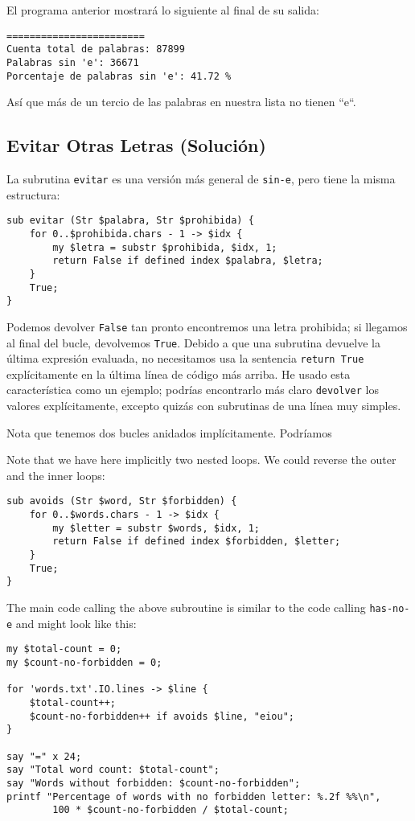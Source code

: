 El programa anterior mostrará lo siguiente al final de 
su salida:

\begin{verbatim}
========================
Cuenta total de palabras: 87899
Palabras sin 'e': 36671
Porcentaje de palabras sin 'e': 41.72 %
\end{verbatim}

Así que más de un tercio de las palabras en nuestra lista no
tienen ``e``.

\subsection{Evitar Otras Letras (Solución)}

La subrutina {\tt evitar} es una versión más general de 
\verb|sin-e|, pero tiene la misma estructura:

\begin{verbatim}
sub evitar (Str $palabra, Str $prohibida) {
    for 0..$prohibida.chars - 1 -> $idx {
        my $letra = substr $prohibida, $idx, 1;
        return False if defined index $palabra, $letra;
    }
    True;
}

\end{verbatim}
%
Podemos devolver {\tt False} tan pronto encontremos una letra
prohibida; si llegamos al final del bucle, devolvemos {\tt True}.
Debido a que una subrutina devuelve la última expresión evaluada,
no necesitamos usa la sentencia {\tt return True} explícitamente
en la última línea de código más arriba. He usado esta característica
como un ejemplo; podrías encontrarlo más claro {\tt devolver} los valores 
explícitamente, excepto quizás con subrutinas de una línea muy simples.

Nota que tenemos dos bucles anidados implícitamente. Podríamos 


Note that we have here implicitly two nested loops. We could 
reverse the outer and the inner loops:

\begin{verbatim}
sub avoids (Str $word, Str $forbidden) {
    for 0..$words.chars - 1 -> $idx {
        my $letter = substr $words, $idx, 1;
        return False if defined index $forbidden, $letter;
    }
    True;
}
\end{verbatim}
%

The main code calling the above subroutine is similar to 
the code calling {\tt has-no-e} and might look like 
this:

\begin{verbatim}
my $total-count = 0;
my $count-no-forbidden = 0;

for 'words.txt'.IO.lines -> $line { 
    $total-count++;
    $count-no-forbidden++ if avoids $line, "eiou";
}

say "=" x 24;
say "Total word count: $total-count";
say "Words without forbidden: $count-no-forbidden";
printf "Percentage of words with no forbidden letter: %.2f %%\n", 
        100 * $count-no-forbidden / $total-count;
\end{verbatim}    
%
  

